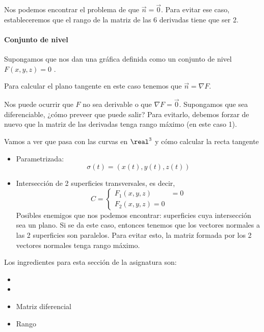      Nos podemos encontrar el problema de que $\overrightarrow{n} = \overrightarrow{0}$. Para evitar ese caso, estableceremos que el rango de la matriz de las 6 derivadas tiene que ser 2.
     
   \paragraph{Conjunto de nivel} Supongamos que nos dan una gráfica definida como un conjunto de nivel $F(x,y,z) = 0$ .
   
   Para calcular el plano tangente en este caso tenemos que $\overrightarrow{n} = \nabla F$. 
   
   Nos puede ocurrir que $F$ no sea derivable o que $\nabla F = \overrightarrow{0}$. Supongamos que sea diferenciable, ¿cómo preveer que puede salir? Para evitarlo, debemos forzar de nuevo que la matriz de las derivadas tenga rango máximo (en este caso 1).
  
  Vamos a ver que pasa con las curvas en $\real^3$ y cómo calcular la recta tangente
  
  \begin{itemize}
   \item Parametrizada: \[\sigma(t) = (x(t),y(t),z(t))\]   
   \item Intersección de 2 superficies transversales, es decir,   
   \[C = \left\{\begin{array}{cc} F_1(x,y,z) &= 0\\ F_2(x,y,z) = 0 \end{array} \right.\]   
   Posibles enemigos que nos podemos encontrar: superficies cuya intersección sea un plano. Si se da este caso, entonces tenemos que los vectores normales a las 2 superficies son paralelos. Para evitar esto, la matriz formada por los 2 vectores normales tenga rango máximo.                                                                   
  \end{itemize}

  Los ingredientes para esta sección de la asignatura son:
  \begin{itemize}
    \item
    \item
   \item Matriz diferencial
   \item Rango
  \end{itemize}

